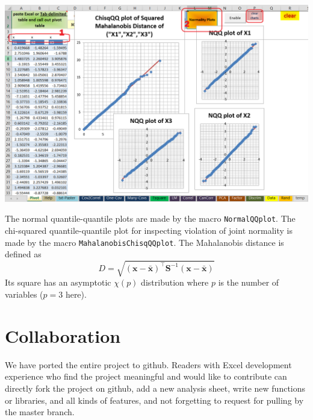 \documentclass[article]{jss}
\numberwithin{equation}{subsection}
\begin{document}
\begin{enumerate}
\begin{center}
	        \includegraphics[width=\linewidth, keepaspectratio=true]{img/PivotSheetNormalityPlots_png}
        \end{center}
        The normal quantile-quantile plots are made by the  macro \texttt{NormalQQplot}. The chi-squared quantile-quantile plot for inspecting violation of joint normality is made by the macro \texttt{MahalanobisChisqQQplot}. The Mahalanobis distance is defined as \[D = \sqrt {{{\left( {\textbf{x} - \bar{\textbf{x}}} \right)}^ \intercal }{\textbf{S}^{ - 1}}\left( {\textbf{x} - \bar{\textbf{x}}} \right)} \]
        Its square has an asymptotic $\chi(p)$ distribution where $p$ is the number of variables ($p=3$ here).
        \end{enumerate}
        
        
        
        \section[software]{Collaboration}
        We have ported the entire project to github. Readers with Excel development experience who find the project meaningful and would like to contribute can directly fork the project on github, add a new analysis sheet, write new functions or libraries, and all kinds of features, and not forgetting to request for pulling by the master branch.
        
\end{document}
